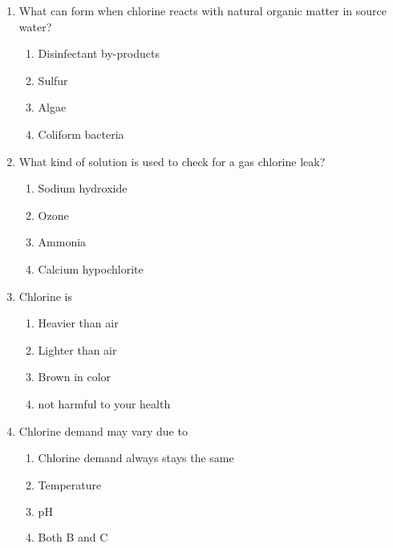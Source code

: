 \documentclass{article}
\begin{document}
\begin{enumerate}
\item What can form when chlorine reacts with natural organic matter in source water?\\
\begin{enumerate}
\item Disinfectant by-products\\
\item Sulfur\\
\item Algae\\
\item Coliform bacteria
\end{enumerate}

\item  What kind of solution is used to check for a gas chlorine leak?\\
\begin{enumerate}
\item Sodium hydroxide\\
\item Ozone\\
\item Ammonia\\
\item Calcium hypochlorite
\end{enumerate}

\item  Chlorine is\\
\begin{enumerate}
\item Heavier than air\\
\item Lighter than air\\
\item Brown in color\\
\item not harmful to your health
\end{enumerate}

\item  Chlorine demand may vary due to\\
\begin{enumerate}
\item Chlorine demand always stays the same\\
\item Temperature\\
\item $\mathrm{pH}$\\
\item Both B and C
\end{enumerate}


\end{enumerate}
\end{document}
